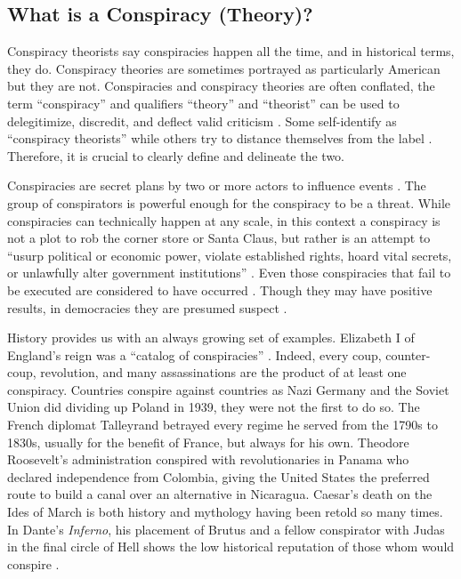 \subsection{What is a Conspiracy (Theory)?}

Conspiracy theorists say conspiracies happen all the time, and in historical terms, they do.
Conspiracy theories are sometimes portrayed as particularly American but they are not.
Conspiracies and conspiracy theories are often conflated, the term ``conspiracy'' and qualifiers ``theory'' and ``theorist'' can be used to delegitimize, discredit, and deflect valid criticism \cite{coady2006}.
Some self-identify as ``conspiracy theorists'' while others try to distance themselves from the label \cite{douglas2019}. 
Therefore, it is crucial to clearly define and delineate the two.

Conspiracies are secret plans by two or more actors to influence events \cite[p. 5]{pidgen1995} \cite[p. 116]{keeley1999}.
The group of conspirators is powerful enough for the conspiracy to be a threat.
While conspiracies can technically happen at any scale, in this context a conspiracy is not a plot to rob the corner store or Santa Claus, but rather is an attempt to ``usurp political or economic power, violate established rights, hoard vital secrets, or unlawfully alter government institutions'' \cite[p. 4]{douglas2019} \cite[p. 206]{sunstein2009} \cite[p. 31]{uscinski2014}.
Even those conspiracies that fail to be executed are considered to have occurred \cite{levy2007}.
Though they may have positive results, in democracies they are presumed suspect \cite{pidgen1995}.

History provides us with an always growing set of examples.
Elizabeth I of England's reign was a ``catalog of conspiracies'' \cite{pidgen1995}.
Indeed, every coup, counter-coup, revolution, and many assassinations are the product of at least one conspiracy. 
Countries conspire against countries as Nazi Germany and the Soviet Union did dividing up Poland in 1939, they were not the first to do so.
The French diplomat Talleyrand betrayed every regime he served from the 1790s to 1830s, usually for the benefit of France, but always for his own.
Theodore Roosevelt's administration conspired with revolutionaries in Panama who declared independence from Colombia, giving the United States the preferred route to build a canal over an alternative in Nicaragua.
Caesar's death on the Ides of March is both history and mythology having been retold so many times.
In Dante's \emph{Inferno}, his placement of Brutus and a fellow conspirator with Judas in the final circle of Hell shows the low historical reputation of those whom would conspire \cite{dante}.

